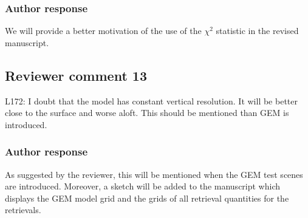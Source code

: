 \documentclass[11pt]{scrartcl}
\begin{document}
\subsubsection*{Author response}

We will provide a better motivation of the use of the $\chi^2$ statistic
in the revised manuscript.


%


\subsection*{Reviewer comment 13}
L172: I doubt that the model has constant vertical resolution.  It will be better close to the surface and worse aloft. This should be mentioned than GEM is introduced.

\subsubsection*{Author response}

As suggested by the reviewer, this will be mentioned when the GEM test scenes are
introduced. Moreover, a sketch will be added to the manuscript which displays the
GEM model grid and the grids of all retrieval quantities for the retrievals.

\end{document}
